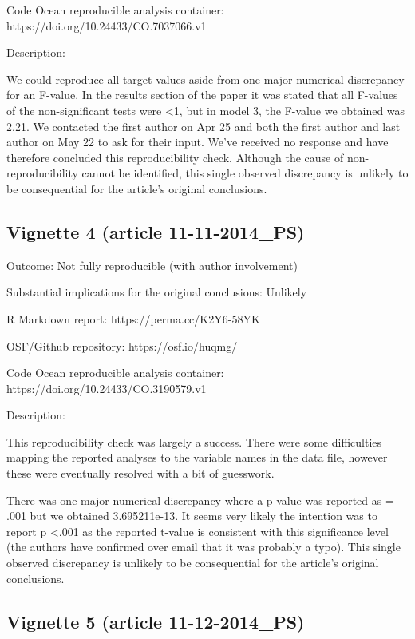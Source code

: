 \begin{appendix}
Code Ocean reproducible analysis container:
https://doi.org/10.24433/CO.7037066.v1

Description:

We could reproduce all target values aside from one major numerical
discrepancy for an F-value. In the results section of the paper it was
stated that all F-values of the non-significant tests were \textless{}1,
but in model 3, the F-value we obtained was 2.21. We contacted the first
author on Apr 25 and both the first author and last author on May 22 to
ask for their input. We've received no response and have therefore
concluded this reproducibility check. Although the cause of
non-reproducibility cannot be identified, this single observed
discrepancy is unlikely to be consequential for the article's original
conclusions.

\hypertarget{vignette-4-article-11-11-2014_ps}{%
\subsection{Vignette 4 (article
11-11-2014\_PS)}\label{vignette-4-article-11-11-2014_ps}}

Outcome: Not fully reproducible (with author involvement)

Substantial implications for the original conclusions: Unlikely

R Markdown report: https://perma.cc/K2Y6-58YK

OSF/Github repository: https://osf.io/huqmg/

Code Ocean reproducible analysis container:
https://doi.org/10.24433/CO.3190579.v1

Description:

This reproducibility check was largely a success. There were some
difficulties mapping the reported analyses to the variable names in the
data file, however these were eventually resolved with a bit of
guesswork.

There was one major numerical discrepancy where a p value was reported
as = .001 but we obtained 3.695211e-13. It seems very likely the
intention was to report p \textless{}.001 as the reported t-value is
consistent with this significance level (the authors have confirmed over
email that it was probably a typo). This single observed discrepancy is
unlikely to be consequential for the article's original conclusions.

\hypertarget{vignette-5-article-11-12-2014_ps}{%
\subsection{Vignette 5 (article
11-12-2014\_PS)}\label{vignette-5-article-11-12-2014_ps}}


\end{appendix}
